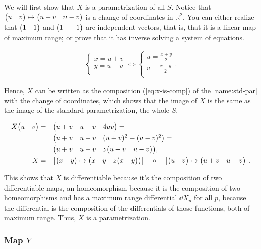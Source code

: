 \documentclass[
    12pt, %
]{fphw}
\newcommand{\R}{\mathbb{R}}
\begin{document}
    We will first show that $X$ is a parametrization of all $S$.
Notice that $\mqty(u & v) \mapsto \mqty(u+v & u-v)$ is a change of coordinates in $\R^2$.
You can either realize that $\mqty(1 & 1)$ and $\mqty(1 & -1)$ are independent vectors,
that is,
that it is a linear map of maximum range;
or prove that it has inverse solving a system of equations.

\begin{align*}
    \begin{cases}
        x = u + v \\
        y = u - v \\
    \end{cases}
    \iff
    \begin{cases}
        u = \frac{x+y}{2} \\
        v = \frac{x-y}{2} \\
    \end{cases}.
\end{align*}

\noindent
Hence, $X$ can be written as the composition (\cref{eq:x-is-comp})
of the \ref{name:std-par} with the change of coordinates,
which shows that the image of $X$ is the same as the image of the
standard parametrization,
the whole $S$.

\begin{equation}\label{eq:x-is-comp}
    \begin{aligned}
        X\mqty(u & v) =& \quad
        \mqty(u+v & u-v & 4uv) = \\
        & \quad
        \mqty(u+v & u-v & (u+v)^2-(u-v)^2) = \\
        & \quad
        \mqty(u+v & u-v & z\mqty(u+v & u-v)), \\
%
        X =& \quad
        \qty[\mqty(x & y) \mapsto \mqty(x & y & z\mqty(x & y))]
        \quad \circ \quad
        \qty[\mqty(u & v) \mapsto \mqty(u+v & u-v)].
    \end{aligned}
\end{equation}

    This shows that $X$ is
differentiable because it's the composition of two differentiable maps,
an homeomorphism because it is the composition of two homeomorphisms and
has a maximum range differential $\dd X_p$ for all $p$,
because the differential is the composition of the differentials of those functions,
both of maximum range.
Thus, $X$ is a parametrization.

\subsubsection*{Map $Y$}
\end{document}
